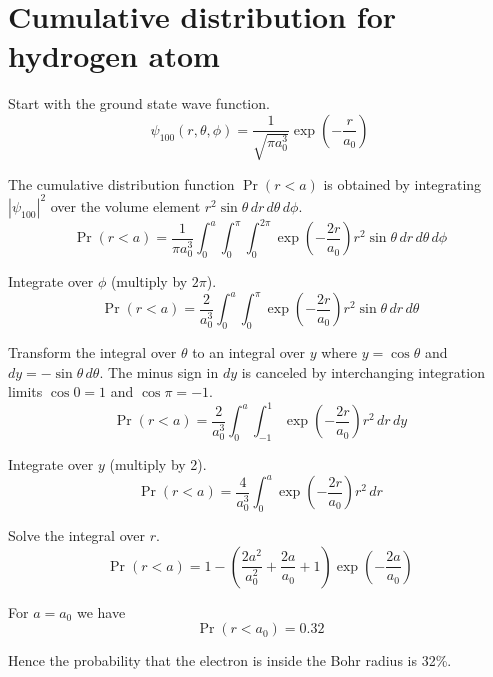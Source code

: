 

\section*{Cumulative distribution for hydrogen atom}

Start with the ground state wave function.
\begin{equation*}
\psi_{100}(r,\theta,\phi)=\frac{1}{\sqrt{\pi a_0^3}}\exp\left(-\frac{r}{a_0}\right)
\end{equation*}

The cumulative distribution function $\Pr(r<a)$ is obtained by integrating
$|\psi_{100}|^2$ over the volume element $r^2\sin\theta\,dr\,d\theta\,d\phi$.
\begin{equation*}
\Pr(r<a)=\frac{1}{\pi a_0^3}
\int_0^a\int_0^\pi\int_0^{2\pi}\exp\left(-\frac{2r}{a_0}\right)
r^2\sin\theta\,dr\,d\theta\,d\phi
\end{equation*}

Integrate over $\phi$ (multiply by $2\pi$).
\begin{equation*}
\Pr(r<a)=\frac{2}{a_0^3}
\int_0^a\int_0^\pi\exp\left(-\frac{2r}{a_0}\right)r^2\sin\theta\,dr\,d\theta
\end{equation*}

Transform the integral over $\theta$ to an integral over $y$ where
$y=\cos\theta$ and $dy=-\sin\theta\,d\theta$.
The minus sign in $dy$ is canceled by interchanging integration limits
$\cos0=1$ and $\cos\pi=-1$.
\begin{equation*}
\Pr(r<a)=\frac{2}{a_0^3}
\int_0^a\int_{-1}^1\exp\left(-\frac{2r}{a_0}\right)r^2\,dr\,dy
\end{equation*}

Integrate over $y$ (multiply by 2).
\begin{equation*}
\Pr(r<a)=\frac{4}{a_0^3}
\int_0^a\exp\left(-\frac{2r}{a_0}\right)r^2\,dr
\end{equation*}

Solve the integral over $r$.
\begin{equation*}
\Pr(r<a)=1-\left(\frac{2a^2}{a_0^2}+\frac{2a}{a_0}+1\right)
\exp\left(-\frac{2a}{a_0}\right)
\tag{1}
\end{equation*}

For $a=a_0$ we have
\begin{equation*}
\Pr(r<a_0)=0.32
\end{equation*}

Hence the probability that the electron is inside the Bohr radius is 32\%.


